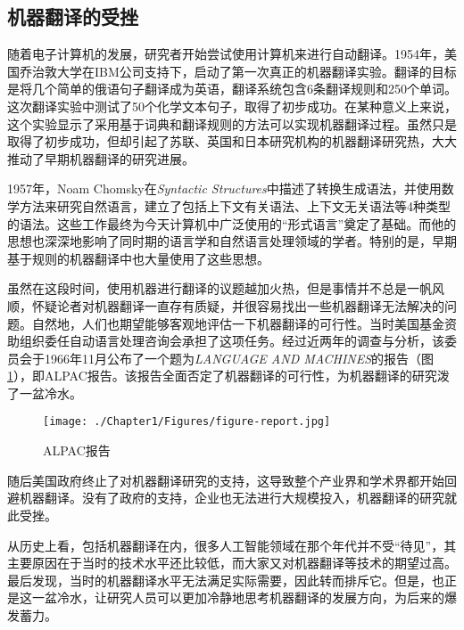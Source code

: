 \subsection{机器翻译的受挫}

\parinterval 随着电子计算机的发展，研究者开始尝试使用计算机来进行自动翻译。1954年，美国乔治敦大学在IBM公司支持下，启动了第一次真正的机器翻译实验。翻译的目标是将几个简单的俄语句子翻译成为英语，翻译系统包含6条翻译规则和250个单词。这次翻译实验中测试了50个化学文本句子，取得了初步成功。在某种意义上来说，这个实验显示了采用基于词典和翻译规则的方法可以实现机器翻译过程。虽然只是取得了初步成功，但却引起了苏联、英国和日本研究机构的机器翻译研究热，大大推动了早期机器翻译的研究进展。

\parinterval 1957年，Noam Chomsky在\emph{Syntactic Structures}中描述了转换生成语法，并使用数学方法来研究自然语言，建立了包括上下文有关语法、上下文无关语法等4种类型的语法。这些工作最终为今天计算机中广泛使用的“形式语言”奠定了基础。而他的思想也深深地影响了同时期的语言学和自然语言处理领域的学者。特别的是，早期基于规则的机器翻译中也大量使用了这些思想。

\parinterval 虽然在这段时间，使用机器进行翻译的议题越加火热，但是事情并不总是一帆风顺，怀疑论者对机器翻译一直存有质疑，并很容易找出一些机器翻译无法解决的问题。自然地，人们也期望能够客观地评估一下机器翻译的可行性。当时美国基金资助组织委任自动语言处理咨询会承担了这项任务。经过近两年的调查与分析，该委员会于1966年11月公布了一个题为\emph{LANGUAGE AND MACHINES}的报告（图\ref{fig:1-4}），即ALPAC报告。该报告全面否定了机器翻译的可行性，为机器翻译的研究泼了一盆冷水。

\begin{figure}[htp]
    \centering
\texttt{[image: ./Chapter1/Figures/figure-report.jpg]}
    \caption{ALPAC报告}
    \label{fig:1-4}
\end{figure}

\parinterval 随后美国政府终止了对机器翻译研究的支持，这导致整个产业界和学术界都开始回避机器翻译。没有了政府的支持，企业也无法进行大规模投入，机器翻译的研究就此受挫。

\parinterval 从历史上看，包括机器翻译在内，很多人工智能领域在那个年代并不受“待见”，其主要原因在于当时的技术水平还比较低，而大家又对机器翻译等技术的期望过高。最后发现，当时的机器翻译水平无法满足实际需要，因此转而排斥它。但是，也正是这一盆冷水，让研究人员可以更加冷静地思考机器翻译的发展方向，为后来的爆发蓄力。


